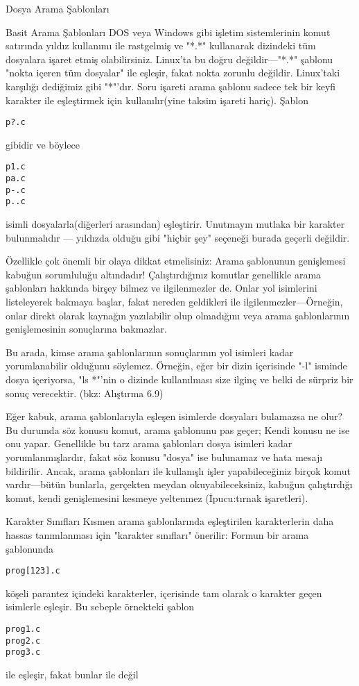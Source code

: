 \begin{section}{Dosya Arama Şablonları}
\begin{subsection}{Basit Arama Şablonları}
	DOS veya Windows gibi işletim sistemlerinin komut satırında yıldız kullanımı ile rastgelmiş ve "*.*" kullanarak dizindeki tüm dosyalara işaret etmiş olabilirsiniz. Linux'ta bu doğru değildir—"*.*" şablonu "nokta içeren tüm dosyalar" ile eşleşir, fakat nokta zorunlu değildir. Linux'taki karşılığı dediğimiz gibi "*"'dır. Soru işareti arama şablonu sadece tek bir keyfi karakter ile eşleştirmek için kullanılır(yine taksim işareti hariç). Şablon
\begin{verbatim}
p?.c
\end{verbatim}
gibidir ve böylece
\begin{verbatim}
p1.c
pa.c
p-.c
p..c
\end{verbatim}
isimli dosyalarla(diğerleri arasından) eşleştirir. Unutmayın mutlaka bir karakter bulunmalıdır — yıldızda olduğu gibi "hiçbir şey" seçeneği burada geçerli değildir.

Özellikle çok önemli bir olaya dikkat etmelisiniz: Arama şablonunun genişlemesi kabuğun sorumluluğu altındadır! Çalıştırdığınız komutlar genellikle arama şablonları hakkında birşey bilmez ve ilgilenmezler de. Onlar yol isimlerini listeleyerek bakmaya başlar, fakat nereden geldikleri ile ilgilenmezler—Örneğin, onlar direkt olarak kaynağın yazılabilir olup olmadığını veya arama şablonlarının genişlemesinin sonuçlarına bakmazlar.

Bu arada, kimse arama şablonlarının sonuçlarının yol isimleri kadar yorumlanabilir olduğunu söylemez. Örneğin, eğer bir dizin içerisinde "-l" isminde dosya içeriyorsa,  "ls *"'nin o dizinde kullanılması size ilginç ve belki de sürpriz bir sonuç verecektir. (bkz: Alıştırma 6.9)

Eğer kabuk, arama şablonlarıyla eşleşen isimlerde dosyaları bulamazsa ne olur? Bu durumda söz konusu komut, arama şablonunu pas geçer; Kendi konusu ne ise onu yapar. Genellikle bu tarz arama şablonları dosya isimleri kadar yorumlanmışlardır, fakat söz konusu "dosya" ise bulunamaz ve hata mesajı bildirilir. Ancak, arama şablonları ile kullanışlı işler yapabileceğiniz birçok komut vardır—bütün bunlarla, gerçekten meydan okuyabileceksiniz, kabuğun çalıştırdığı komut, kendi genişlemesini kesmeye yeltenmez (İpucu:tırnak işaretleri).
\end{subsection}
\begin{subsection}{Karakter Sınıfları}
Kısmen arama şablonlarında eşleştirilen karakterlerin daha hassas tanımlanması için "karakter sınıfları" önerilir: Formun bir arama şablonunda
\begin{verbatim}
prog[123].c
\end{verbatim}
köşeli parantez içindeki karakterler, içerisinde tam olarak o karakter geçen isimlerle eşleşir. Bu sebeple örnekteki şablon
\begin{verbatim}
prog1.c
prog2.c
prog3.c
\end{verbatim}
ile eşleşir, fakat bunlar ile değil


\end{subsection}
\end{section}
